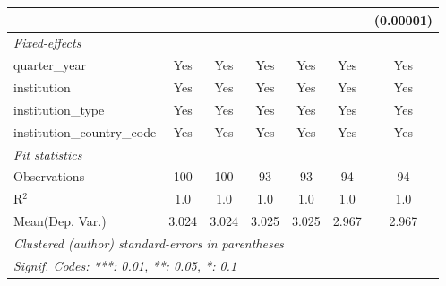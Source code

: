\begin{tabular}{lcccccc}
                                      &               &                &               &               &               & (0.00001)\\   
   \midrule
   \emph{Fixed-effects}\\
   quarter\_year                      & Yes           & Yes            & Yes           & Yes           & Yes           & Yes\\  
   institution                        & Yes           & Yes            & Yes           & Yes           & Yes           & Yes\\  
   institution\_type                  & Yes           & Yes            & Yes           & Yes           & Yes           & Yes\\  
   institution\_country\_code         & Yes           & Yes            & Yes           & Yes           & Yes           & Yes\\  
   \midrule
   \emph{Fit statistics}\\
   Observations                       & 100           & 100            & 93            & 93            & 94            & 94\\  
   R$^2$                              & 1.0           & 1.0            & 1.0           & 1.0           & 1.0           & 1.0\\  
Mean(Dep. Var.) & 3.024 & 3.024 & 3.025 & 3.025 & 2.967 & 2.967 \\
   \midrule \midrule
   \multicolumn{7}{l}{\emph{Clustered (author) standard-errors in parentheses}}\\
   \multicolumn{7}{l}{\emph{Signif. Codes: ***: 0.01, **: 0.05, *: 0.1}}\\
\end{tabular}
\par\endgroup
